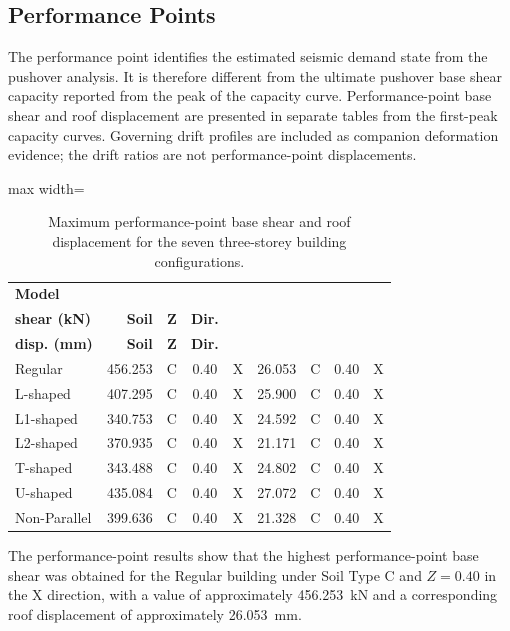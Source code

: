 

\subsection{Performance Points}
The performance point identifies the estimated seismic demand state from the pushover analysis. It is therefore different from the ultimate pushover base shear capacity reported from the peak of the capacity curve. Performance-point base shear and roof displacement are presented in separate tables from the first-peak capacity curves. Governing drift profiles are included as companion deformation evidence; the drift ratios are not performance-point displacements.

\begin{table}[!htbp]
\caption{Maximum performance-\allowbreak{}point base shear and roof displacement for the seven three-storey building configurations.}
\label{tab:ch4_pp_max}
\centering
\footnotesize
\setlength{\tabcolsep}{3pt}
\begin{adjustbox}{max width=\linewidth}
\begin{tabular}{@{}l r c c c r c c c@{}}
\toprule
\textbf{Model} & \shortstack{\textbf{Max. PP base}\\\textbf{shear (kN)}} & \textbf{Soil} & \textbf{Z} & \textbf{Dir.} & \shortstack{\textbf{Max. PP roof}\\\textbf{disp. (mm)}} & \textbf{Soil} & \textbf{Z} & \textbf{Dir.}\\
\midrule
Regular & 456.253 & C & 0.40 & X & 26.053 & C & 0.40 & X\\
L-shaped & 407.295 & C & 0.40 & X & 25.900 & C & 0.40 & X\\
L1-shaped & 340.753 & C & 0.40 & X & 24.592 & C & 0.40 & X\\
L2-shaped & 370.935 & C & 0.40 & X & 21.171 & C & 0.40 & X\\
T-shaped & 343.488 & C & 0.40 & X & 24.802 & C & 0.40 & X\\
U-shaped & 435.084 & C & 0.40 & X & 27.072 & C & 0.40 & X\\
Non-Parallel & 399.636 & C & 0.40 & X & 21.328 & C & 0.40 & X\\
\bottomrule
\end{tabular}
\end{adjustbox}
\end{table}

The performance-point results show that the highest performance-\allowbreak{}point base shear was obtained for the Regular building under Soil Type C and $Z=0.40$ in the X direction, with a value of approximately 456.253~kN and a corresponding roof displacement of approximately 26.053~mm.

